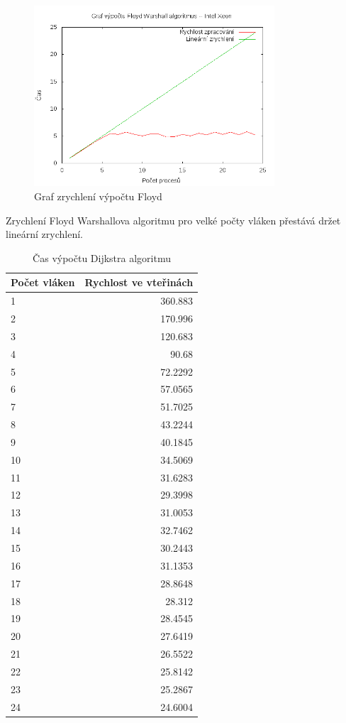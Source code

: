 \documentclass[10pt,a4paper]{article}
\begin{document}
\begin{figure}[H]
  \centering
    \includegraphics[width=0.8\textwidth]{graf_floyd_intel.png}
  \caption{Graf zrychlení výpočtu Floyd}
  \label{fig:floyd}
\end{figure}

Zrychlení Floyd Warshallova algoritmu pro velké počty vláken přestává držet lineární zrychlení.


\begin{table}[H]
  \centering
	\caption{Čas výpočtu Dijkstra algoritmu}
	\begin{tabular}{| l | r |}
\hline
Počet vláken & Rychlost ve vteřinách \\ \hline
1 & 360.883 \\ \hline
2 & 170.996 \\ \hline
3 & 120.683 \\ \hline
4 & 90.68 \\ \hline
5 & 72.2292 \\ \hline
6 & 57.0565 \\ \hline
7 & 51.7025 \\ \hline
8 & 43.2244 \\ \hline
9 & 40.1845 \\ \hline
10 & 34.5069 \\ \hline
11 & 31.6283 \\ \hline
12 & 29.3998 \\ \hline
13 & 31.0053 \\ \hline
14 & 32.7462 \\ \hline
15 & 30.2443 \\ \hline
16 & 31.1353 \\ \hline
17 & 28.8648 \\ \hline
18 & 28.312 \\ \hline
19 & 28.4545 \\ \hline
20 & 27.6419 \\ \hline
21 & 26.5522 \\ \hline
22 & 25.8142 \\ \hline
23 & 25.2867 \\ \hline
24 & 24.6004 \\ \hline
	\end{tabular}
  \label{tab:djfl}
\end{table}
\end{document}
